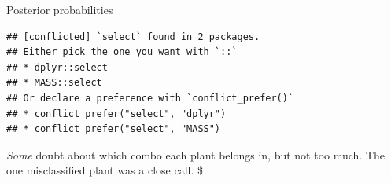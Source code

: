 \documentclass[ignorenonframetext,]{beamer}
\newenvironment{Shaded}{\begin{snugshade}}{\end{snugshade}}
\newcommand{\DataTypeTok}[1]{\textcolor[rgb]{0.13,0.29,0.53}{#1}}
\newcommand{\DecValTok}[1]{\textcolor[rgb]{0.00,0.00,0.81}{#1}}
\newcommand{\KeywordTok}[1]{\textcolor[rgb]{0.13,0.29,0.53}{\textbf{#1}}}
\newcommand{\NormalTok}[1]{#1}
\newcommand{\OperatorTok}[1]{\textcolor[rgb]{0.81,0.36,0.00}{\textbf{#1}}}
\newcommand{\StringTok}[1]{\textcolor[rgb]{0.31,0.60,0.02}{#1}}
\begin{document}
\begin{frame}[fragile]{Posterior probabilities}
\protect\hypertarget{posterior-probabilities-1}{}

\begin{Shaded}
\end{Shaded}

\begin{verbatim}
## [conflicted] `select` found in 2 packages.
## Either pick the one you want with `::` 
## * dplyr::select
## * MASS::select
## Or declare a preference with `conflict_prefer()`
## * conflict_prefer("select", "dplyr")
## * conflict_prefer("select", "MASS")
\end{verbatim}

\emph{Some} doubt about which combo each plant belongs in, but not too
much. The one misclassified plant was a close call. \$

\end{frame}
\end{document}
